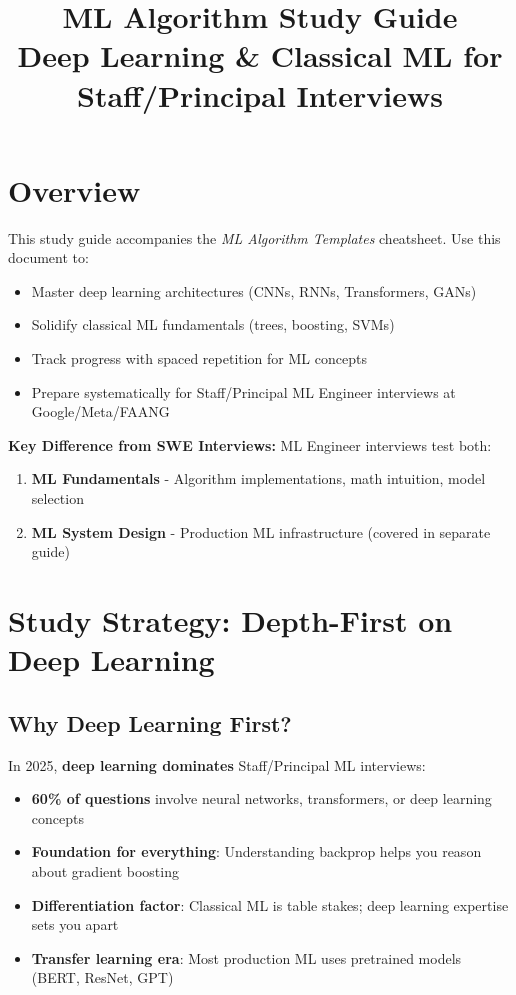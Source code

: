 \documentclass[10pt]{article}
\title{\textbf{ML Algorithm Study Guide} \\ \large Deep Learning \& Classical ML for Staff/Principal Interviews}
\author{}
\date{}
\begin{document}
\maketitle

\section*{Overview}

This study guide accompanies the \textit{ML Algorithm Templates} cheatsheet. Use this document to:
\begin{itemize}
\item Master deep learning architectures (CNNs, RNNs, Transformers, GANs)
\item Solidify classical ML fundamentals (trees, boosting, SVMs)
\item Track progress with spaced repetition for ML concepts
\item Prepare systematically for Staff/Principal ML Engineer interviews at Google/Meta/FAANG
\end{itemize}

\textbf{Key Difference from SWE Interviews:}
ML Engineer interviews test both:
\begin{enumerate}
\item \textbf{ML Fundamentals} - Algorithm implementations, math intuition, model selection
\item \textbf{ML System Design} - Production ML infrastructure (covered in separate guide)
\end{enumerate}

\section{Study Strategy: Depth-First on Deep Learning}

\subsection{Why Deep Learning First?}

In 2025, \textbf{deep learning dominates} Staff/Principal ML interviews:
\begin{itemize}
\item \textbf{60\% of questions} involve neural networks, transformers, or deep learning concepts
\item \textbf{Foundation for everything}: Understanding backprop helps you reason about gradient boosting
\item \textbf{Differentiation factor}: Classical ML is table stakes; deep learning expertise sets you apart
\item \textbf{Transfer learning era}: Most production ML uses pretrained models (BERT, ResNet, GPT)
\end{itemize}
\end{document}
